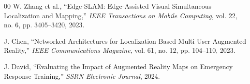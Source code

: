 \documentclass[conference]{IEEEtran}
\begin{document}
\begin{thebibliography}{00}
 W. Zhang et al., ``Edge-SLAM: Edge-Assisted Visual Simultaneous Localization and Mapping,'' \textit{IEEE Transactions on Mobile Computing}, vol. 22, no. 6, pp. 3405--3420, 2023.

 J. Chen, ``Networked Architectures for Localization-Based Multi-User Augmented Reality,'' \textit{IEEE Communications Magazine}, vol. 61, no. 12, pp. 104--110, 2023.

 J. David, ``Evaluating the Impact of Augmented Reality Maps on Emergency Response Training,'' \textit{SSRN Electronic Journal}, 2024.

\end{thebibliography}
\end{document}

